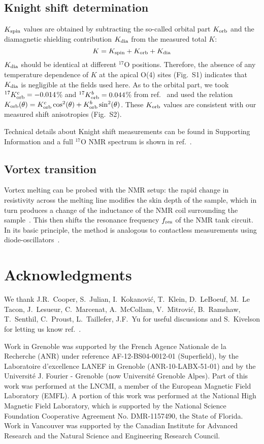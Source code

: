 \documentclass[superscriptaddress,twocolumn,prl,preprintnumbers,amsmath,amssymb]{revtex4}
\begin{document}
\subsection*{\bf Knight shift determination}
$K_{\rm spin}$ values are obtained by subtracting the so-called orbital part $K_{\rm orb}$ and the diamagnetic shielding contribution $K_{\rm dia}$ from the measured total $K$:
\begin{equation}
K = K_{\rm spin} + K_{\rm orb} + K_{\rm dia}
\end{equation}
$K_{\rm dia}$ should be identical at different $^{17}$O positions. Therefore, the absence of any temperature dependence of $K$ at the apical O(4) sites (Fig.~S1) indicates that $K_{\rm dia}$ is negligible at the fields used here. As to the orbital part, we took $^{17}K^{c}_{\rm orb}=-0.014$\% and $^{17}K^{b}_{\rm orb}=0.044$\% from ref.~\cite{Takigawa89} and used the relation $K_{\rm orb}(\theta)=K^c_{\rm orb} \cos^2(\theta)+K^b_{\rm orb} \sin^2(\theta)$. These $K_{\rm orb}$ values are consistent with our measured shift anisotropies (Fig.~S2).

Technical details about Knight shift measurements can be found in Supporting Information and a full $^{17}$O NMR spectrum is shown in ref.~\cite{Zhou17}.

\subsection*{\bf Vortex transition}
Vortex melting can be probed with the NMR setup: the rapid change in resistivity across the melting line modifies the skin depth of the sample, which in turn produces a change of the inductance of the NMR coil surrounding the sample~\cite{PDO}. This then shifts the resonance frequency $f_{\rm res}$ of the NMR tank circuit. In its basic principle, the method is analogous to contactless measurements using diode-oscillators~\cite{PDO}.


\section{Acknowledgments}
We thank J.R.~Cooper, S.~Julian, I.~Kokanovi\'c, T.~Klein, D.~LeBoeuf, M.~Le Tacon, J.~Lesueur, C.~Marcenat, A.~McCollam, V.~Mitrovi\'c, B.~Ramshaw, T.~Senthil, C.~Proust, L.~Taillefer, J.F.~Yu for useful discussions and S.~Kivelson for letting us know ref.~\cite{Spivak}.

Work in Grenoble was supported by the French Agence Nationale de la Recherche (ANR) under reference AF-12-BS04-0012-01 (Superfield), by the Laboratoire d'excellence LANEF in Grenoble (ANR-10-LABX-51-01) and by the Universit\'e J. Fourier - Grenoble (now Universit\'e Grenoble Alpes). Part of this work was performed at the LNCMI, a member of the European Magnetic Field Laboratory (EMFL). A portion of this work was performed at the National High Magnetic Field Laboratory, which is supported by the National Science Foundation Cooperative Agreement No. DMR-1157490, the State of Florida. Work in Vancouver was supported by the Canadian Institute for Advanced Research and the Natural Science and Engineering Research Council.
\end{document}

